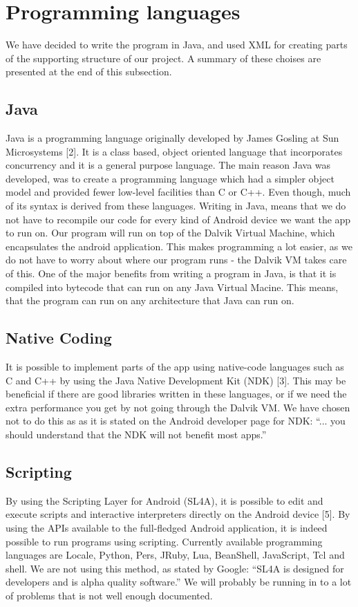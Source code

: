 
\section{Programming languages}
We have decided to write the program in Java, and used XML for creating parts of the supporting structure of our project. A summary of these choises are presented at the end of this subsection.

\subsection{Java}
Java is a programming language originally developed by James Gosling at Sun Microsystems [2]. It is a class based, object oriented language that incorporates concurrency and it is a general purpose language. The main reason Java was developed, was to create a programming language which had a simpler object model and provided fewer low-level facilities than C or C++. Even though, much of its syntax is derived from these languages.
\newline
\newline
Writing in Java, means that we do not have to recompile our code for every kind of Android device we want the app to run on. Our program will run on top of the Dalvik Virtual Machine, which encapsulates the android application. This makes programming a lot easier, as we do not have to worry about where our program runs - the Dalvik VM takes care of this.
\newline
\newline
One of the major benefits from writing a program in Java, is that it is compiled into bytecode that can run on any Java Virtual Macine. This means, that the program can run on any architecture that Java can run on.

\subsection{Native Coding}
It is possible to implement parts of the app using native-code languages such as C and C++ by using the Java Native Development Kit (NDK) [3]. This may be beneficial if there are good libraries written in these languages, or if we need the extra performance you get by not going through the Dalvik VM. We have chosen not to do this as as it is stated on the Android developer page for NDK: “... you should understand that the NDK will not benefit most apps.”

\subsection{Scripting}
By using the Scripting Layer for Android (SL4A), it is possible to edit and execute scripts and interactive interpreters directly on the Android device [5]. By using the APIs available to the full-fledged Android application, it is indeed possible to run programs using scripting. Currently available programming languages are Locale, Python, Pers, JRuby, Lua, BeanShell, JavaScript, Tcl and shell. We are not using this method, as stated by Google: “SL4A is designed for developers and is alpha quality software.” We will probably be running in to a lot of problems that is not well enough documented.

